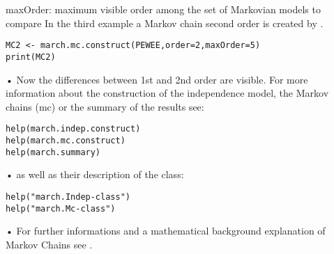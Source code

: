 maxOrder:   \hspace{0pt}maximum visible order among the set of Markovian models to compare\newpage
\hspace*{-17pt}In the third example a Markov chain second order is created by \M.
\begin{verbatim}
MC2 <- march.mc.construct(PEWEE,order=2,maxOrder=5)
print(MC2)
\end{verbatim}•
Now the differences between 1st and 2nd order are visible. For more information about the construction of the independence model, the Markov chains (mc) or the summary of the results see:
\begin{verbatim}
help(march.indep.construct)
help(march.mc.construct)
help(march.summary)
\end{verbatim}•
as well as their description of the class: 
\begin{verbatim}
help("march.Indep-class")
help("march.Mc-class")
\end{verbatim}•
For further informations and a mathematical background explanation of Markov Chains see \cite{berchtold2002mixture}.
